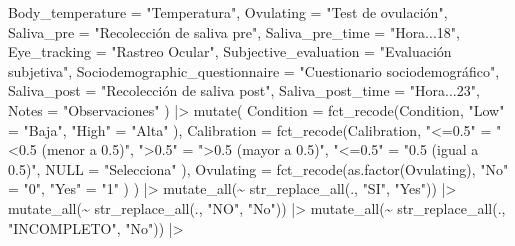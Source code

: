 \documentclass[
  bookmarksnumbered]{article}
\newenvironment{Shaded}{\begin{snugshade}}{\end{snugshade}}
\newcommand{\AttributeTok}[1]{\textcolor[rgb]{0.80,0.80,0.80}{#1}}
\newcommand{\FunctionTok}[1]{\textcolor[rgb]{0.94,0.94,0.56}{#1}}
\newcommand{\NormalTok}[1]{\textcolor[rgb]{0.80,0.80,0.80}{#1}}
\newcommand{\OtherTok}[1]{\textcolor[rgb]{0.94,0.94,0.56}{#1}}
\newcommand{\SpecialCharTok}[1]{\textcolor[rgb]{0.86,0.64,0.64}{#1}}
\newcommand{\StringTok}[1]{\textcolor[rgb]{0.80,0.58,0.58}{#1}}
\begin{document}
\begin{Shaded}
\begin{Highlighting}[]
    \AttributeTok{Body\_temperature =} \StringTok{"Temperatura"}\NormalTok{,}
    \AttributeTok{Ovulating =} \StringTok{"Test de ovulación"}\NormalTok{,}
    \AttributeTok{Saliva\_pre =} \StringTok{"Recolección de saliva pre"}\NormalTok{,}
    \AttributeTok{Saliva\_pre\_time =} \StringTok{"Hora...18"}\NormalTok{,}
    \AttributeTok{Eye\_tracking =} \StringTok{"Rastreo Ocular"}\NormalTok{,}
    \AttributeTok{Subjective\_evaluation =} \StringTok{"Evaluación subjetiva"}\NormalTok{,}
    \AttributeTok{Sociodemographic\_questionnaire =} \StringTok{"Cuestionario sociodemográfico"}\NormalTok{,}
    \AttributeTok{Saliva\_post =} \StringTok{"Recolección de saliva post"}\NormalTok{,}
    \AttributeTok{Saliva\_post\_time =} \StringTok{"Hora...23"}\NormalTok{,}
    \AttributeTok{Notes =} \StringTok{"Observaciones"}
\NormalTok{  ) }\SpecialCharTok{|\textgreater{}}
  \FunctionTok{mutate}\NormalTok{(}
    \AttributeTok{Condition =} \FunctionTok{fct\_recode}\NormalTok{(Condition,}
                           \StringTok{"Low"} \OtherTok{=} \StringTok{"Baja"}\NormalTok{,}
                           \StringTok{"High"} \OtherTok{=} \StringTok{"Alta"}
\NormalTok{    ),}
    \AttributeTok{Calibration =} \FunctionTok{fct\_recode}\NormalTok{(Calibration,}
                             \StringTok{"\textless{}=0.5"} \OtherTok{=} \StringTok{"\textless{}0.5 (menor a 0.5)"}\NormalTok{,}
                             \StringTok{"\textgreater{}0.5"} \OtherTok{=} \StringTok{"\textgreater{}0.5 (mayor a 0.5)"}\NormalTok{,}
                             \StringTok{"\textless{}=0.5"} \OtherTok{=} \StringTok{"0.5 (igual a 0.5)"}\NormalTok{,}
                             \AttributeTok{NULL =} \StringTok{"Selecciona"}
\NormalTok{    ),}
    \AttributeTok{Ovulating =} \FunctionTok{fct\_recode}\NormalTok{(}\FunctionTok{as.factor}\NormalTok{(Ovulating),}
                           \StringTok{"No"} \OtherTok{=} \StringTok{"0"}\NormalTok{,}
                           \StringTok{"Yes"} \OtherTok{=} \StringTok{"1"}
\NormalTok{    )}
\NormalTok{  ) }\SpecialCharTok{|\textgreater{}}
  \FunctionTok{mutate\_all}\NormalTok{(}\SpecialCharTok{\textasciitilde{}} \FunctionTok{str\_replace\_all}\NormalTok{(., }\StringTok{"SI"}\NormalTok{, }\StringTok{"Yes"}\NormalTok{)) }\SpecialCharTok{|\textgreater{}}
  \FunctionTok{mutate\_all}\NormalTok{(}\SpecialCharTok{\textasciitilde{}} \FunctionTok{str\_replace\_all}\NormalTok{(., }\StringTok{"NO"}\NormalTok{, }\StringTok{"No"}\NormalTok{)) }\SpecialCharTok{|\textgreater{}}
  \FunctionTok{mutate\_all}\NormalTok{(}\SpecialCharTok{\textasciitilde{}} \FunctionTok{str\_replace\_all}\NormalTok{(., }\StringTok{"INCOMPLETO"}\NormalTok{, }\StringTok{"No"}\NormalTok{)) }\SpecialCharTok{|\textgreater{}}

\end{Highlighting}
\end{Shaded}
\end{document}
